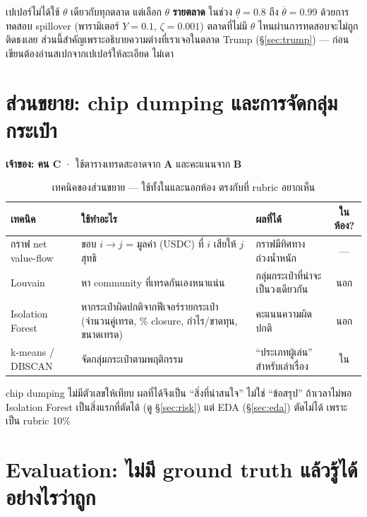 \documentclass[11pt,a4paper]{article}
\newcommand{\sansall}{\sffamily}
\newcommand{\en}[1]{#1}
\newcommand{\stg}[2]{\textcolor{#1}{\textbf{\en{#2}}}}
\newcommand{\rA}{\stg{accent}{A}}
\newcommand{\rB}{\stg{alg}{B}}
\newcommand{\rC}{\stg{ext}{C}}
\newcommand{\thd}[1]{\sansall\bfseries #1}
\begin{document}
เปเปอร์ไม่ได้ใช้ $\theta$ เดียวกับทุกตลาด แต่เลือก $\theta$ \textbf{รายตลาด}
ในช่วง $\underline{\theta} = 0.8$ ถึง $\overline{\theta} = 0.99$ ด้วยการทดสอบ spillover
(พารามิเตอร์ $Y = 0.1$, $\zeta = 0.001$) ตลาดที่ไม่มี $\theta$ ไหนผ่านการทดสอบจะไม่ถูกติดธงเลย
ส่วนนี้สำคัญเพราะอธิบายความต่างที่เราเจอในตลาด Trump (§\ref{sec:trump})
--- ก่อนเขียนต้องอ่านสเปกจากเปเปอร์ให้ละเอียด ไม่เดา

\section{ส่วนขยาย: chip dumping และการจัดกลุ่มกระเป๋า}
\label{sec:ext}

\textbf{เจ้าของ: คน \rC} · ใช้ตารางเทรดสะอาดจาก \rA{} และคะแนนจาก \rB

\begin{table}[H]
\centering\small
\begin{tabular}{L{3.0cm}L{5.4cm}L{4.4cm}c}
\toprule
\thd{เทคนิค} & \thd{ใช้ทำอะไร} & \thd{ผลที่ได้} & \thd{ในห้อง?} \\
\midrule
กราฟ net value-flow & ขอบ $i \to j$ = มูลค่า (USDC) ที่ $i$ เสียให้ $j$ สุทธิ &
  กราฟมีทิศทาง ถ่วงน้ำหนัก & --- \\
\addlinespace
Louvain & หา community ที่เทรดกันเองหนาแน่น & กลุ่มกระเป๋าที่น่าจะเป็นวงเดียวกัน & นอก \\
\addlinespace
Isolation Forest & หากระเป๋าผิดปกติจากฟีเจอร์รายกระเป๋า
  (จำนวนคู่เทรด, \% closure, กำไร/ขาดทุน, ขนาดเทรด) & คะแนนความผิดปกติ & นอก \\
\addlinespace
k-means / DBSCAN & จัดกลุ่มกระเป๋าตามพฤติกรรม & ``ประเภทผู้เล่น'' สำหรับเล่าเรื่อง & ใน \\
\bottomrule
\end{tabular}
\caption{เทคนิคของส่วนขยาย --- ใช้ทั้งในและนอกห้อง ตรงกับที่ rubric อยากเห็น}
\end{table}

\begin{warnbox}[title={ส่วนขยายต้องไม่กินเวลาของแกนหลัก}]
chip dumping ไม่มีตัวเลขให้เทียบ ผลที่ได้จึงเป็น ``สิ่งที่น่าสนใจ'' ไม่ใช่ ``ข้อสรุป''
ถ้าเวลาไม่พอ Isolation Forest เป็นสิ่งแรกที่ตัดได้ (ดู §\ref{sec:risk})
แต่ EDA (§\ref{sec:eda}) ตัดไม่ได้ เพราะเป็น rubric 10\%
\end{warnbox}

\section{Evaluation: ไม่มี ground truth แล้วรู้ได้อย่างไรว่าถูก}
\label{sec:eval}
\end{document}
